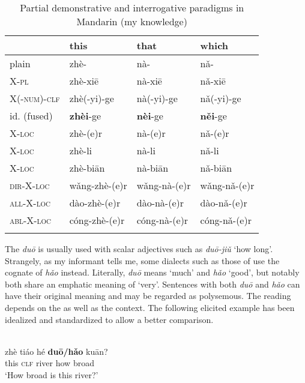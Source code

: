 \begin{table}
\caption{Partial demonstrative and interrogative paradigms in Mandarin (my knowledge)}
\label{tab:trans:7}

\begin{tabularx}{\textwidth}{XXXl}
\lsptoprule
& \textbf{this} & \textbf{that} & \textbf{which}\\
\midrule
plain & zhè- & nà- & nǎ-\\
\textsc{X-pl} & zhè-xi\=e & nà-xi\=e & nǎ-xi\=e\\
\textsc{X(-num)-clf} & zhè(-yi)-ge & nà(-yi)-ge & nǎ(-yi)-ge\\
id. (fused) & \textbf{zhèi}-ge & \textbf{nèi}-ge & \textbf{něi}-ge\\
\textsc{X-loc} & zhè-(e)r & nà-(e)r & nǎ-(e)r\\
\textsc{X-loc} & zhè-li & nà-li & nǎ-li\\
\textsc{X-loc} & zhè-biān & nà-biān & nǎ-biān\\
\textsc{dir-X-loc} & wǎng-zhè-(e)r & wǎng-nà-(e)r & wǎng-nǎ-(e)r\\
\textsc{all-X-loc} & dào-zhè-(e)r & dào-nà-(e)r & dào-nǎ-(e)r\\
\textsc{abl-X}\textsc{-loc} & cóng-zhè-(e)r & cóng-nà-(e)r & cóng-nǎ-(e)r\\
\lspbottomrule
\end{tabularx}
\end{table}

\newpage 
The  \textit{duō} is usually used with scalar adjectives such as \textit{duō-jiǔ}  ‘how long’. Strangely, as my informant tells me, some dialects such as those of  use the cognate of  \textit{hǎo}  instead. Literally, \textit{duō}  means ‘much’ and \textit{hǎo}  ‘good’, but notably both share an emphatic meaning of ‘very’. Sentences with both \textit{duō} and \textit{hǎo} can have their original meaning and may be regarded as polysemous. The reading depends on the  as well as the context. The following elicited example has been idealized and standardized to allow a better comparison.

\ea%
    \label{ex:trans:49}
    \\
    \gll zhè  tiáo  hé \textbf{{du}}\textbf{{ō}}\textbf{{/}}\textbf{{hǎo}} {kuān?}\\
    this  \textsc{clf}  river  how    broad\\
    \glt ‘How broad is this river?’
    \z

